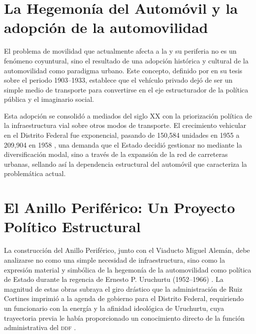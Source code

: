 \section{La Hegemonía del Automóvil y la adopción de la automovilidad}
\label{sec:hegemonia-automovil}

El problema de movilidad que actualmente afecta a la \cdmx{} y su periferia no
es
un fenómeno coyuntural, sino el resultado de una adopción histórica y cultural
de la
automovilidad como paradigma urbano. Este concepto, definido por
\citet{franco2022} en su tesis sobre el periodo 1903--1933, establece que el
vehículo privado dejó de ser un simple medio de transporte para convertirse en
el
eje estructurador de la política pública y el imaginario social.

Esta adopción se consolidó a mediados del siglo XX con la priorización política
de
la infraestructura vial sobre otros modos de transporte. El crecimiento
vehicular en
el Distrito Federal fue exponencial, pasando de 150,584 unidades en 1955 a
209,904 en 1958 \citep{perlo2023}, una demanda que el Estado decidió
gestionar
no mediante la diversificación modal, sino a través de la expansión de la red de
carreteras urbanas, sellando así la dependencia estructural del automóvil que
caracteriza la problemática actual.

\section{El Anillo Periférico: Un Proyecto Político Estructural}
\label{sec:anillo-periferico}

La construcción del Anillo Periférico, junto con el Viaducto Miguel Alemán, debe
analizarse no como una simple necesidad de infraestructura, sino como la
expresión
material y simbólica de la hegemonía de la automovilidad como política de Estado
durante la regencia de Ernesto P. Uruchurtu (1952--1966) \citep{franco2022}.
La magnitud de estas obras subraya el giro drástico que la administración de
Ruiz
Cortines imprimió a la agenda de gobierno para el Distrito Federal, requiriendo
un
funcionario con la energía y la afinidad ideológica de Uruchurtu, cuya
trayectoria
previa le había proporcionado un conocimiento directo de la función
administrativa
del \textsc{ddf} \citep[Tomo~1, p.~173]{perlo2023}.

